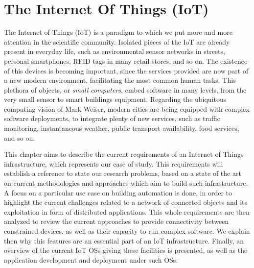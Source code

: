 \chapter{The Internet Of Things (IoT)}
\label{ch:IoT}

The Internet of Things (IoT) is a paradigm to which we put more and more attention in the scientific community\cite{atzori2010iotsurvey}.
Isolated pieces of the IoT are already present in everyday life, such as environmental sensor networks in streets, personal smartphones, RFID tags in many retail stores, and so on.
The existence of this devices is becoming important, since the services provided are now part of a new modern environment, facilitating the most common human tasks.
This plethora of objects, or \textit{small computers}, embed software in many levels, from the very small sensor to smart buildings equipment.
Regarding the ubiquitous computing vision of Mark Weiser\cite{weiser1999ubiquitous}, modern cities are being equipped with complex software deployments, to integrate plenty of new services, such as traffic monitoring, instantaneous weather, public transport availability, food services, and so on.

This chapter aims to describe the current requirements of an Internet of Things infrastructure, which represents our case of study.
This requirements will establish a reference to state our research problems, based on a state of the art on current methodologies and approaches which aim to build such infrastructure.
A focus on a particular use case on building automation is done, in order to highlight the current challenges related to a network of connected objects and its exploitation in form of distributed applications.
This whole requirements are then analyzed to review the current approaches to provide connectivity between constrained devices, as well as their capacity to run complex software.
We explain then why this features are an essential part of an IoT infrastructure.
Finally, an overview of the current IoT OSs giving these facilities is presented, as well as the application development and deployment under such OSs.



